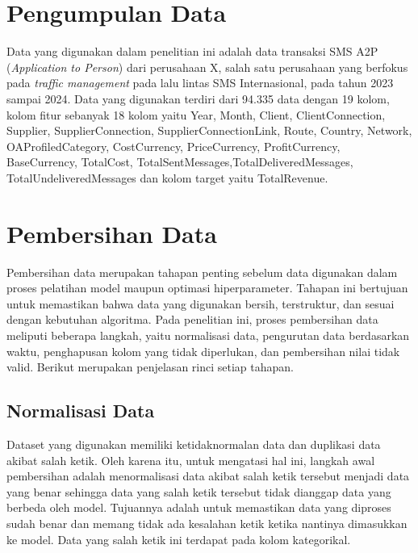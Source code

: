     \section{Pengumpulan Data}\label{sec:data collection}
    Data yang digunakan dalam penelitian ini adalah data transaksi SMS A2P (\textit{Application to Person}) dari perusahaan X, salah satu perusahaan yang berfokus pada \textit{traffic management} pada lalu lintas SMS Internasional,  pada tahun 2023 sampai 2024. Data yang digunakan terdiri dari 94.335 data dengan 19 kolom, kolom fitur sebanyak 18 kolom  yaitu Year, Month, Client, ClientConnection, Supplier, SupplierConnection, SupplierConnectionLink, Route, Country, Network, OAProfiledCategory,  CostCurrency, PriceCurrency, ProfitCurrency, BaseCurrency, TotalCost, TotalSentMessages,TotalDeliveredMessages, TotalUndeliveredMessages dan kolom target yaitu TotalRevenue.

    \section{Pembersihan Data}\label{sec:preprocessing}
    Pembersihan data merupakan tahapan penting sebelum data digunakan dalam proses pelatihan model maupun optimasi hiperparameter. Tahapan ini bertujuan untuk memastikan bahwa data yang digunakan bersih, terstruktur, dan sesuai dengan kebutuhan algoritma. Pada penelitian ini, proses pembersihan data meliputi beberapa langkah, yaitu normalisasi data, pengurutan data berdasarkan waktu, penghapusan kolom yang tidak diperlukan, dan pembersihan nilai tidak valid. Berikut merupakan penjelasan rinci setiap tahapan.

    \subsection{Normalisasi Data}\label{}

    Dataset yang digunakan memiliki ketidaknormalan data dan duplikasi data akibat salah ketik. Oleh karena itu, untuk mengatasi hal ini, langkah awal pembersihan adalah menormalisasi data akibat salah ketik tersebut menjadi data yang benar sehingga data yang salah ketik tersebut tidak dianggap data yang berbeda oleh model. Tujuannya adalah untuk memastikan data yang diproses sudah benar dan memang tidak ada kesalahan ketik ketika nantinya dimasukkan ke model. Data yang salah ketik ini terdapat pada kolom kategorikal.

